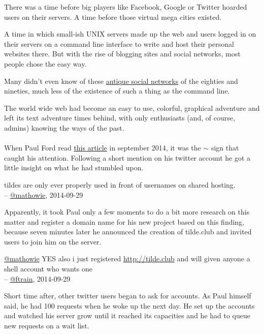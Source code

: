 There was a time before big players like Facebook, Google or Twitter hoarded users on their servers. A time before those virtual mega cities existed.

A time in which small-ish UNIX servers made up the web and users logged in on their servers on a command line interface to write and host their personal websites there. But with the rise of blogging sites and social networks, most people chose the easy way.

Many didn't even know of these \href{http://www.loomcom.com/blog/2014/10/13/the-1993-social-network/}{antique social networks} of the eighties and nineties, much less of the existence of such a thing as the command line.

The world wide web had become an easy to use, colorful, graphical adventure and left its text adventure times behind, with only enthusiasts (and, of course, admins) knowing the ways of the past.
\\
\\
When Paul Ford read \href{http://rockalittle.com/thanksgiving2004.htm}{this article} in september 2014, it was the $\sim$ sign that caught his attention. Following a short mention on his twitter account he got a little insight on what he had stumbled upon.

\begin{displayquote}
tildes are only ever properly used in front of usernames on shared hosting.\\
-- \href{https://twitter.com/mathowie/status/516776784868548608}{@mathowie}, 2014-09-29
\end{displayquote}

Apparently, it took Paul only a few moments to do a bit more research on this matter and register a domain name for his new project based on this finding, because seven minutes later he announced the creation of tilde.club and invited users to join him on the server.

\begin{displayquote}
\href{https://twitter.com/mathowie/}{@mathowie} YES also i just registered \href{http://tilde.club}{http://tilde.club}  and will given anyone a shell account who wants one\\
-- \href{https://twitter.com/ftrain/status/516778575828381696}{@ftrain}, 2014-09-29
\end{displayquote}

Short time after, other twitter users began to ask for accounts. As Paul himself said, he had 100 requests when he woke up the next day. He set up the accounts and watched his server grow until it reached its capacities and he had to queue new requests on a wait list.

